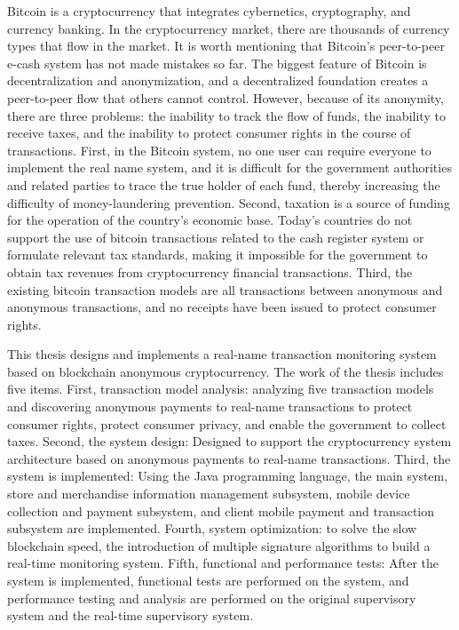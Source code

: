 \begin{eabstract}
	Bitcoin is a cryptocurrency that integrates cybernetics, cryptography, and currency banking. In the cryptocurrency market, there are thousands of currency types that flow in the market. It is worth mentioning that Bitcoin's peer-to-peer e-cash system has not made mistakes so far. The biggest feature of Bitcoin is decentralization and anonymization, and a decentralized foundation creates a peer-to-peer flow that others cannot control. However, because of its anonymity, there are three problems: the inability to track the flow of funds, the inability to receive taxes, and the inability to protect consumer rights in the course of transactions. First, in the Bitcoin system, no one user can require everyone to implement the real name system, and it is difficult for the government authorities and related parties to trace the true holder of each fund, thereby increasing the difficulty of money-laundering prevention. Second, taxation is a source of funding for the operation of the country’s economic base. Today’s countries do not support the use of bitcoin transactions related to the cash register system or formulate relevant tax standards, making it impossible for the government to obtain tax revenues from cryptocurrency financial transactions. Third, the existing bitcoin transaction models are all transactions between anonymous and anonymous transactions, and no receipts have been issued to protect consumer rights.

	This thesis designs and implements a real-name transaction monitoring system based on blockchain anonymous cryptocurrency. The work of the thesis includes five items. First, transaction model analysis: analyzing five transaction models and discovering anonymous payments to real-name transactions to protect consumer rights, protect consumer privacy, and enable the government to collect taxes. Second, the system design: Designed to support the cryptocurrency system architecture based on anonymous payments to real-name transactions. Third, the system is implemented: Using the Java programming language, the main system, store and merchandise information management subsystem, mobile device collection and payment subsystem, and client mobile payment and transaction subsystem are implemented. Fourth, system optimization: to solve the slow blockchain speed, the introduction of multiple signature algorithms to build a real-time monitoring system. Fifth, functional and performance tests: After the system is implemented, functional tests are performed on the system, and performance testing and analysis are performed on the original supervisory system and the real-time supervisory system.


\end{eabstract}
